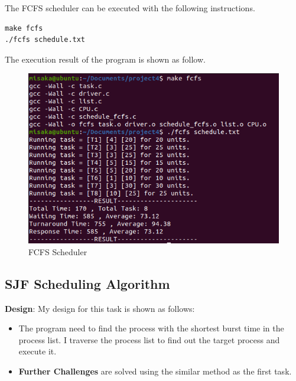 \documentclass[UTF8,10pt,a4paper]{article}
\theoremstyle{Problem}
\theoremstyle{Solution}
\begin{document}
The FCFS scheduler can be executed with the following instructions.
\begin{lstlisting}
make fcfs
./fcfs schedule.txt
\end{lstlisting}

The execution result of the program is shown as follow.

\begin{figure}[H]
    \centering
    \includegraphics[width=400pt]{1fcfs.png}
    \caption{FCFS Scheduler}
    \label{3}
\end{figure}




\subsection{SJF Scheduling Algorithm}

\textbf{Design}: My design for this task is shown as follows:

\begin{itemize}
    \item The program need to find the process with the shortest burst time in the process list. I traverse the process list to find out the target process and execute it.
    \item \textbf{Further Challenges} are solved using the similar method as the first task.
\end{itemize}
\end{document}
